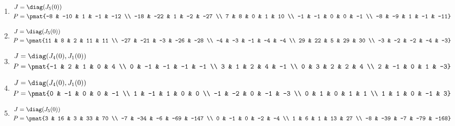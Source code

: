 \begin{enumerate}
\item

\begin{align*}
J &= \diag(J_{5}(0))\\
P &= \pmat{-8 & -10 & 1 & -1 & -12 \\ -18 & -22 & 1 & -2 & -27 \\ 7 & 8 & 0 & 1 & 10 \\ -1 & -1 & 0 & 0 & -1 \\ -8 & -9 & 1 & -1 & -11}
\end{align*}

\item

\begin{align*}
J &= \diag(J_{5}(0))\\
P &= \pmat{11 & 8 & 2 & 11 & 11 \\ -27 & -21 & -3 & -26 & -28 \\ -4 & -3 & -1 & -4 & -4 \\ 29 & 22 & 5 & 29 & 30 \\ -3 & -2 & -2 & -4 & -3}
\end{align*}

\item

\begin{align*}
J &= \diag(J_{4}(0), J_{1}(0))\\
P &= \pmat{-1 & 2 & 1 & 0 & 4 \\ 0 & -1 & -1 & -1 & -1 \\ 3 & 1 & 2 & 4 & -1 \\ 0 & 3 & 2 & 2 & 4 \\ 2 & -1 & 0 & 1 & -3}
\end{align*}

\item

\begin{align*}
J &= \diag(J_{4}(0), J_{1}(0))\\
P &= \pmat{0 & -1 & 0 & 0 & -1 \\ 1 & -1 & 1 & 0 & 0 \\ -1 & -2 & 0 & -1 & -3 \\ 0 & 1 & 0 & 1 & 1 \\ 1 & 1 & 0 & -1 & 3}
\end{align*}

\item

\begin{align*}
J &= \diag(J_{5}(0))\\
P &= \pmat{3 & 16 & 3 & 33 & 70 \\ -7 & -34 & -6 & -69 & -147 \\ 0 & -1 & 0 & -2 & -4 \\ 1 & 6 & 1 & 13 & 27 \\ -8 & -39 & -7 & -79 & -168}
\end{align*}


\end{enumerate}
